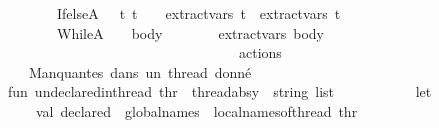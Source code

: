 \begin{isabellebody}
\ \ \ \ \ \ \ \ \ \ \ \ \ \ {\isacharbar}{\kern0pt}\ IfelseA\ \ {\isacharparenleft}{\kern0pt}{\isacharparenleft}{\kern0pt}{\isacharunderscore}{\kern0pt}{\isacharcomma}{\kern0pt}\ t{}{\isacharparenright}{\kern0pt}{\isacharcomma}{\kern0pt}\ t{}{\isacharparenright}{\kern0pt}\ \ \ {\isacharequal}{\kern0pt}{\isachargreater}{\kern0pt}\ extract{\isacharunderscore}{\kern0pt}vars\ t{}\ {\isacharat}{\kern0pt}\ extract{\isacharunderscore}{\kern0pt}vars\ t{}\isanewline
\ \ \ \ \ \ \ \ \ \ \ \ \ \ {\isacharbar}{\kern0pt}\ WhileA\ \ \ {\isacharparenleft}{\kern0pt}{\isacharunderscore}{\kern0pt}{\isacharcomma}{\kern0pt}\ body{\isacharparenright}{\kern0pt}\ \ \ \ \ \ \ {\isacharequal}{\kern0pt}{\isachargreater}{\kern0pt}\ extract{\isacharunderscore}{\kern0pt}vars\ body\isanewline
\ \ \ \ \ \ \ \ \ \ \ \ \ \ {\isacharbar}{\kern0pt}\ {\isacharunderscore}{\kern0pt}\ \ \ \ \ \ \ \ \ \ \ \ \ \ \ \ \ \ \ \ \ \ \ \ {\isacharequal}{\kern0pt}{\isachargreater}{\kern0pt}\ {\isacharbrackleft}{\kern0pt}{\isacharbrackright}{\kern0pt}{\isacharparenright}{\kern0pt}\ actions{\isacharparenright}{\kern0pt}\isanewline
\ \ \ \ \isanewline
\ \ \ \ \ \ \ \ {\isacharparenleft}{\kern0pt}{\isacharasterisk}{\kern0pt}\ {\isacharminus}{\kern0pt}{\isacharminus}{\kern0pt}{\isacharminus}{\kern0pt}{\isacharminus}{\kern0pt}{\isacharminus}{\kern0pt}{\isacharminus}{\kern0pt}{\isacharminus}{\kern0pt}{\isacharminus}{\kern0pt}{\isacharminus}{\kern0pt}{\isacharminus}{\kern0pt}{\isacharminus}{\kern0pt}{\isacharminus}{\kern0pt}{\isacharminus}{\kern0pt}{\isacharminus}{\kern0pt}{\isacharminus}{\kern0pt}{\isacharminus}{\kern0pt}{\isacharminus}{\kern0pt}{\isacharminus}{\kern0pt}\ {}{\isachardot}{\kern0pt}\ Manquantes\ dans\ un\ thread\ donné\ {\isacharminus}{\kern0pt}{\isacharminus}{\kern0pt}{\isacharminus}{\kern0pt}{\isacharminus}{\kern0pt}{\isacharminus}{\kern0pt}{\isacharminus}{\kern0pt}{\isacharminus}{\kern0pt}{\isacharminus}{\kern0pt}{\isacharminus}{\kern0pt}{\isacharminus}{\kern0pt}\ {\isacharasterisk}{\kern0pt}{\isacharparenright}{\kern0pt}\isanewline
\ \ \ \ \ \ \ \ fun\ undeclared{\isacharunderscore}{\kern0pt}in{\isacharunderscore}{\kern0pt}thread\ {\isacharparenleft}{\kern0pt}thr\ {\isacharcolon}{\kern0pt}\ thread{\isacharunderscore}{\kern0pt}absy{\isacharparenright}{\kern0pt}\ {\isacharcolon}{\kern0pt}\ string\ list\ {\isacharequal}{\kern0pt}\isanewline
\ \ \ \ \ \ \ \ \ \ let\isanewline
\ \ \ \ \ \ \ \ \ \ \ \ val\ declared\ {\isacharequal}{\kern0pt}\ global{\isacharunderscore}{\kern0pt}names\ {\isacharat}{\kern0pt}\ local{\isacharunderscore}{\kern0pt}names{\isacharunderscore}{\kern0pt}of{\isacharunderscore}{\kern0pt}thread\ thr\isanewline

\end{isabellebody}
